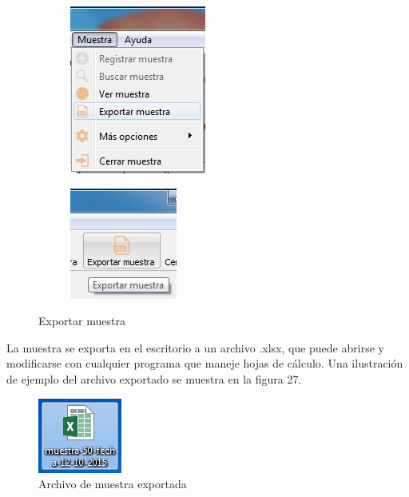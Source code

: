\begin{figure}[H]
\centering
\begin{subfigure}{.5\textwidth}
  \centering
  \includegraphics[width=.6\linewidth]{./img/exportar-menu.jpg}
\end{subfigure}%
\begin{subfigure}{.5\textwidth}
  \centering
  \includegraphics[width=.45\linewidth]{./img/exportar-barra.jpg}
\end{subfigure}
\caption{Exportar muestra}
\end{figure}

	La muestra se exporta en el escritorio a un archivo .xlsx, que puede abrirse y modificarse con cualquier programa que maneje hojas de c\'{a}lculo. Una ilustraci\'{o}n de ejemplo del archivo exportado se muestra en la figura 27.
	
\begin{figure}[H]
  \centering
  \includegraphics[width=.25\linewidth]{./img/muestra-exportada.jpg}
\caption{Archivo de muestra exportada}
\end{figure}


